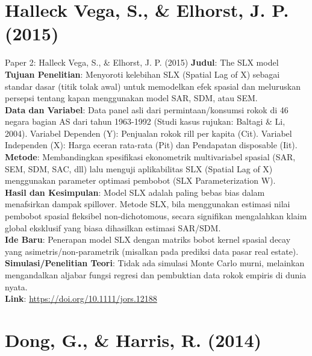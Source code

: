 \documentclass{beamer}
\begin{document}
\section{Halleck Vega, S., \& Elhorst, J. P. (2015)}

\begin{frame}[allowframebreaks]{Paper 2: Halleck Vega, S., \& Elhorst, J. P. (2015)}
    \textbf{Judul}: The SLX model \\
    \textbf{Tujuan Penelitian}: Menyoroti kelebihan SLX (Spatial Lag of X) sebagai standar dasar (titik tolak awal) untuk memodelkan efek spasial dan meluruskan persepsi tentang kapan menggunakan model SAR, SDM, atau SEM. \\
    \vspace{0.3cm}
    \textbf{Data dan Variabel}: Data panel asli dari permintaan/konsumsi rokok di 46 negara bagian AS dari tahun 1963-1992 (Studi kasus rujukan: Baltagi \& Li, 2004). Variabel Dependen (Y): Penjualan rokok rill per kapita (Cit). Variabel Independen (X): Harga eceran rata-rata (Pit) dan Pendapatan disposable (Iit). \\
    \vspace{0.3cm}
    \textbf{Metode}: Membandingkan spesifikasi ekonometrik multivariabel spasial (SAR, SEM, SDM, SAC, dll) lalu menguji aplikabilitas SLX (Spatial Lag of X) menggunakan parameter optimasi pembobot (SLX Parameterization W). \\
    \framebreak
    \textbf{Hasil dan Kesimpulan}: Model SLX adalah paling bebas bias dalam menafsirkan dampak spillover. Metode SLX, bila menggunakan estimasi nilai pembobot spasial fleksibel non-dichotomous, secara signifikan mengalahkan klaim global eksklusif yang biasa dihasilkan estimasi SAR/SDM. \\
    \vspace{0.3cm}
    \textbf{Ide Baru}: Penerapan model SLX dengan matriks bobot kernel spasial decay yang asimetris/non-parametrik (misalkan pada prediksi data pasar real estate). \\
    \vspace{0.3cm}
    \textbf{Simulasi/Penelitian Teori}: Tidak ada simulasi Monte Carlo murni, melainkan mengandalkan aljabar fungsi regresi dan pembuktian data rokok empiris di dunia nyata. \\
    \vspace{0.3cm}
    \textbf{Link}: \url{https://doi.org/10.1111/jors.12188}
\end{frame}

\section{Dong, G., \& Harris, R. (2014)}
\end{document}
